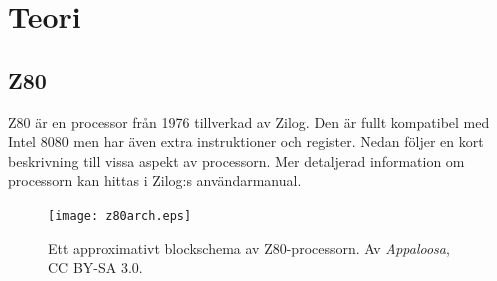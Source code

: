 \documentclass[main.tex]{subfiles}
\begin{document}
\section{Teori}
\subsection{Z80}
Z80 är en processor från 1976 tillverkad av Zilog. Den är fullt kompatibel med
Intel 8080 men har även extra instruktioner och register. Nedan följer en kort
beskrivning till vissa aspekt av processorn. Mer detaljerad information om
processorn kan hittas i Zilog:s användarmanual.\cite{z80um}

\begin{figure}
    \center
    \texttt{[image: z80arch.eps]}
    \caption{Ett approximativt blockschema av Z80-processorn. Av {\it
    Appaloosa}, CC BY-SA 3.0.}
\end{figure}
\end{document}
